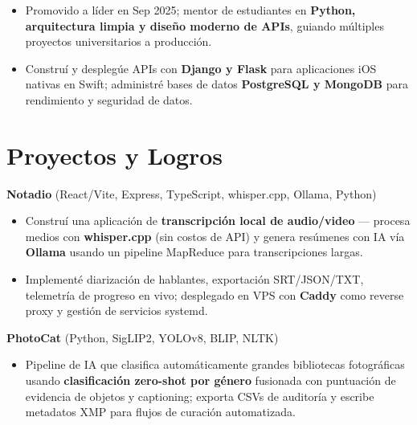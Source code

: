 \documentclass[10pt, letterpaper]{article}
\newenvironment{cvlist}{%
  \begin{itemize}[leftmargin=1.4em,itemsep=1pt,topsep=2pt,parsep=0pt]
}{\end{itemize}}
\begin{document}
\begin{cvlist}
  \item Promovido a l\'{i}der en Sep 2025; mentor de estudiantes en
        \textbf{Python, arquitectura limpia y dise\~{n}o moderno de APIs},
        guiando m\'{u}ltiples proyectos universitarios a producci\'{o}n.
  \item Constru\'{i} y despleg\'{u}e APIs con \textbf{Django y Flask} para
        aplicaciones iOS nativas en Swift; administr\'{e} bases de datos
        \textbf{PostgreSQL y MongoDB} para rendimiento y seguridad de datos.
\end{cvlist}

\section{Proyectos y Logros}

\noindent\textbf{Notadio} (React/Vite, Express, TypeScript, whisper.cpp, Ollama, Python)

\begin{cvlist}
  \item Constru\'{i} una aplicaci\'{o}n de \textbf{transcripci\'{o}n local de
        audio/video} --- procesa medios con \textbf{whisper.cpp} (sin costos
        de API) y genera res\'{u}menes con IA v\'{i}a \textbf{Ollama} usando un
        pipeline MapReduce para transcripciones largas.
  \item Implement\'{e} diarizaci\'{o}n de hablantes, exportaci\'{o}n SRT/JSON/TXT,
        telemetr\'{i}a de progreso en vivo; desplegado en VPS con \textbf{Caddy}
        como reverse proxy y gesti\'{o}n de servicios systemd.
\end{cvlist}

\smallskip

\noindent\textbf{PhotoCat} (Python, SigLIP2, YOLOv8, BLIP, NLTK)

\begin{cvlist}
  \item Pipeline de IA que clasifica autom\'{a}ticamente grandes bibliotecas
        fotogr\'{a}ficas usando \textbf{clasificaci\'{o}n zero-shot por g\'{e}nero}
        fusionada con puntuaci\'{o}n de evidencia de objetos y captioning;
        exporta CSVs de auditor\'{i}a y escribe metadatos XMP para flujos de
        curaci\'{o}n automatizada.
\end{cvlist}

\smallskip
\end{document}
